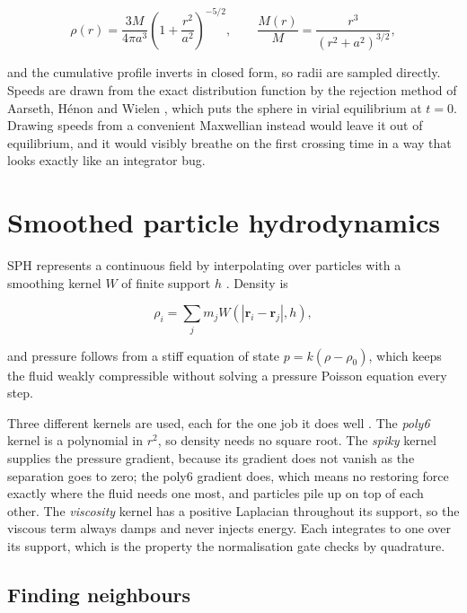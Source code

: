 \begin{equation}
  \rho(r) = \frac{3M}{4\pi a^3}\left(1 + \frac{r^2}{a^2}\right)^{-5/2},
  \qquad
  \frac{M(r)}{M} = \frac{r^3}{\left(r^2 + a^2\right)^{3/2}},
\end{equation}

and the cumulative profile inverts in closed form, so radii are sampled
directly. Speeds are drawn from the exact distribution function by the
rejection method of Aarseth, H\'{e}non and Wielen \cite{aarseth1974}, which puts
the sphere in virial equilibrium at $t = 0$. Drawing speeds from a convenient
Maxwellian instead would leave it out of equilibrium, and it would visibly
breathe on the first crossing time in a way that looks exactly like an
integrator bug.

\section{Smoothed particle hydrodynamics}

SPH represents a continuous field by interpolating over particles with a
smoothing kernel $W$ of finite support $h$ \cite{monaghan1992}. Density is

\begin{equation}
  \rho_i = \sum_j m_j W\!\left(\left|\mathbf{r}_i - \mathbf{r}_j\right|, h\right),
\end{equation}

and pressure follows from a stiff equation of state $p = k(\rho - \rho_0)$,
which keeps the fluid weakly compressible without solving a pressure Poisson
equation every step.

Three different kernels are used, each for the one job it does well
\cite{muller2003}. The \emph{poly6} kernel is a polynomial in $r^2$, so density
needs no square root. The \emph{spiky} kernel supplies the pressure gradient,
because its gradient does not vanish as the separation goes to zero; the poly6
gradient does, which means no restoring force exactly where the fluid needs one
most, and particles pile up on top of each other. The \emph{viscosity} kernel
has a positive Laplacian throughout its support, so the viscous term always
damps and never injects energy. Each integrates to one over its support, which
is the property the normalisation gate checks by quadrature.

\subsection{Finding neighbours}

